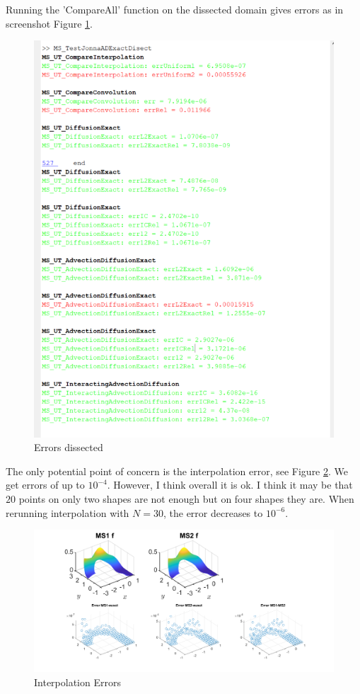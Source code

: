 \documentclass[11pt, a4paper]{article}
\theoremstyle{definition}
\begin{document}
   Running the 'CompareAll' function on the dissected domain gives errors as in screenshot Figure \ref{FS}.
   \begin{figure}[h]
   	\centering
   	\includegraphics[scale=0.8]{Errors.png}
   	\caption{Errors dissected} 
   	\label{FS}
   \end{figure}
   The only potential point of concern is the interpolation error, see Figure \ref{FInterpE}. We get errors of up to $10^{-4}$. However, I think overall it is ok. I think it may be that $20$ points on only two shapes are not enough but on four shapes they are. When rerunning interpolation with $N = 30$, the error decreases to $10^{-6}$.
    \begin{figure}[h]
   	\centering
   	\includegraphics[scale=0.3]{InterpE.png}
   	\caption{Interpolation Errors} 
   	\label{FInterpE}
   \end{figure}
\end{document}
